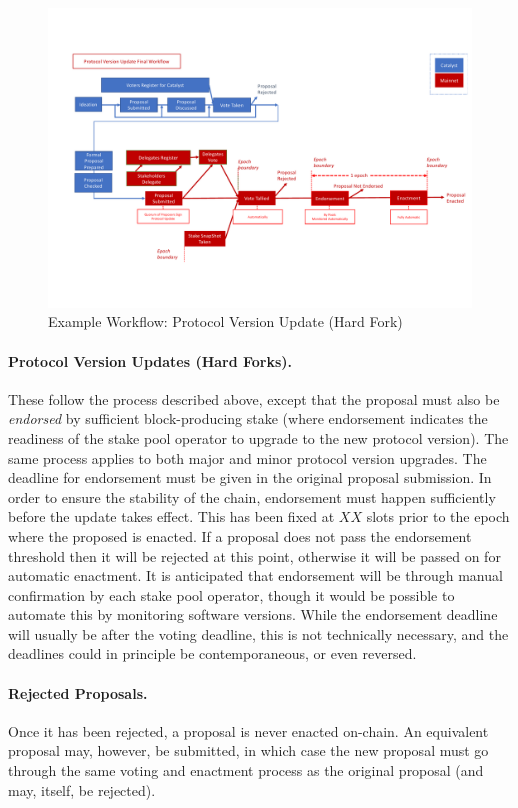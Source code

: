 \begin{figure}
  \includegraphics[trim=0 90 0 80,clip,width=\textwidth]{Workflow2}
  \caption{Example Workflow: Protocol Version Update (Hard Fork)}
  \label{fig:workflow-hf}
\end{figure}

\paragraph{Protocol Version Updates (Hard Forks).}  These follow the process described above,
except that the proposal must also be \emph{endorsed} by sufficient block-producing stake
(where endorsement indicates the readiness of the stake pool operator to upgrade to the new protocol version).
The same process applies to both major and minor protocol version upgrades.
The deadline for endorsement must be given in the original proposal submission.
In order to ensure the stability of the chain, endorsement must happen sufficiently before the update takes
effect.  This has been fixed at $XX$ slots prior to the epoch where the proposed is enacted.
If a proposal does not pass the endorsement threshold then it will be rejected at this point, otherwise it will be
passed on for automatic enactment.  It is anticipated that endorsement will be through manual confirmation by each stake pool operator, though it would be possible
to automate this by monitoring software versions.
While the endorsement deadline will usually be after the voting deadline, this is not technically necessary, and the deadlines could
in principle be contemporaneous, or even reversed.

\paragraph{Rejected Proposals.}   Once it has been rejected, a proposal is never enacted on-chain.
An equivalent proposal may, however, be submitted, in which case the new proposal must go through the same voting and enactment process
as the original proposal (and may, itself, be rejected).
